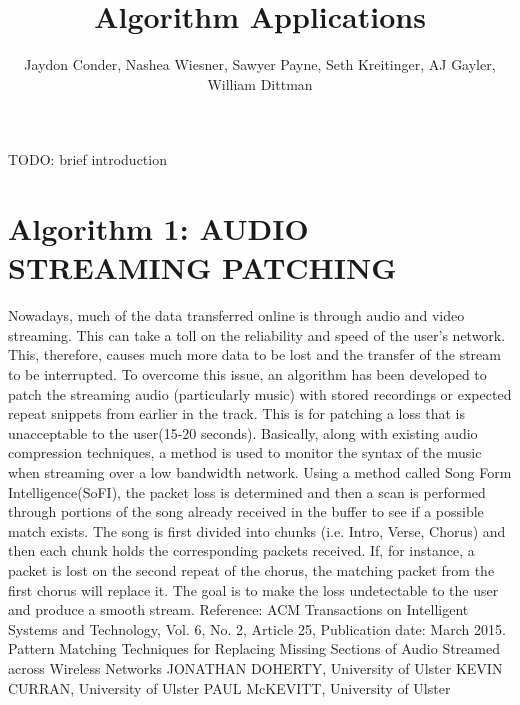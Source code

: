 \documentclass[11pt]{article}
\title{Algorithm Applications} %
\author{Jaydon Conder, Nashea Wiesner, Sawyer Payne, Seth Kreitinger, AJ Gayler, William Dittman}
\begin{document}
\maketitle

TODO: brief introduction

\section{Algorithm 1: AUDIO STREAMING PATCHING}
Nowadays, much of the data transferred online is through audio and video streaming. This can take a toll on the
reliability and speed of the user's network.  This, therefore, causes much more data to be lost and the transfer 
of the stream to be interrupted.  To overcome this issue, an algorithm has been developed to patch the streaming
audio (particularly music) with stored recordings or expected repeat snippets from earlier in the track.  This 
is for patching a loss that is unacceptable to the user(15-20 seconds).  Basically, along with existing audio compression 
techniques, a method is used to monitor the syntax of the music when streaming over a low bandwidth network.  
Using a method called Song Form Intelligence(SoFI), the packet loss is determined and then a scan is performed through portions of the song already received in the buffer to see if a possible match exists.  The song is first divided into chunks (i.e. 
Intro, Verse, Chorus)  and then each chunk holds the corresponding packets received.  If, for instance, a packet is lost 
on the second repeat of the chorus, the matching packet from the first chorus will replace it.  The goal is to make
the loss undetectable to the user and produce a smooth stream.
Reference: ACM Transactions on Intelligent Systems and Technology, Vol. 6, No. 2, Article 25, Publication date: March 2015.
Pattern Matching Techniques for Replacing Missing Sections of
Audio Streamed across Wireless Networks
JONATHAN DOHERTY, University of Ulster
KEVIN CURRAN, University of Ulster
PAUL McKEVITT, University of Ulster
\end{document}
